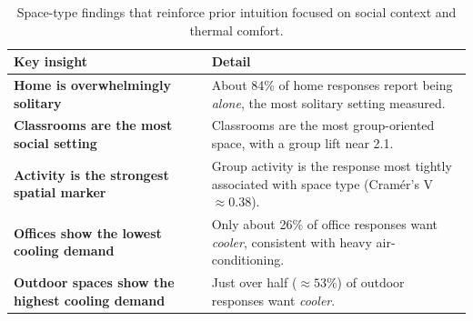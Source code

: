 \begin{table}[htbp]
\centering
\caption{Space-type findings that reinforce prior intuition focused on social context and thermal comfort.}
\label{tab:insights-social-thermal}
\footnotesize
\renewcommand{\arraystretch}{1.3}
\begin{tabularx}{\textwidth}{@{}>{\raggedright\arraybackslash\bfseries}p{} >{\raggedright\arraybackslash}X@{}}
\toprule
\normalfont\textbf{Key insight} & \textbf{Detail} \\
\midrule
Home is overwhelmingly solitary & About 84\% of home responses report being \emph{alone}, the most solitary setting measured. \\
Classrooms are the most social setting & Classrooms are the most group-oriented space, with a group lift near 2.1. \\
Activity is the strongest spatial marker & Group activity is the response most tightly associated with space type (Cram\'er's V $\approx 0.38$). \\
Offices show the lowest cooling demand & Only about 26\% of office responses want \emph{cooler}, consistent with heavy air-conditioning. \\
Outdoor spaces show the highest cooling demand & Just over half ($\approx 53\%$) of outdoor responses want \emph{cooler}. \\
\bottomrule
\end{tabularx}
\end{table}
